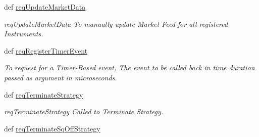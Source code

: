 \begin{DoxyCompactItemize}
def \hyperlink{classmuTradePyBase_1_1CustomStrategy_a5c7564a367c3c88a87757cb9ed1ba524}{req\-Update\-Market\-Data}
\begin{DoxyCompactList}\small\item\em req\-Update\-Market\-Data To manually update Market Feed for all registered Instruments. \end{DoxyCompactList}\item 
def \hyperlink{classmuTradePyBase_1_1CustomStrategy_abc1635dff1eb4c69e2186fa29b4c8389}{req\-Register\-Timer\-Event}
\begin{DoxyCompactList}\small\item\em To request for a Timer-\/\-Based event, The event to be called back in time duration passed as argument in microseconds. \end{DoxyCompactList}\item 
def \hyperlink{classmuTradePyBase_1_1CustomStrategy_a337047b7b53dd750bf49d0c5d2bb3aa7}{req\-Terminate\-Strategy}
\begin{DoxyCompactList}\small\item\em req\-Terminate\-Strategy Called to Terminate Strategy. \end{DoxyCompactList}\item 
\hypertarget{classmuTradePyBase_1_1CustomStrategy_a0ee6f82eaa36ab5ee2e41ac377915c89}{def \hyperlink{classmuTradePyBase_1_1CustomStrategy_a0ee6f82eaa36ab5ee2e41ac377915c89}{req\-Terminate\-Sq\-Off\-Strategy}}\label{classmuTradePyBase_1_1CustomStrategy_a0ee6f82eaa36ab5ee2e41ac377915c89}


\end{DoxyCompactItemize}
